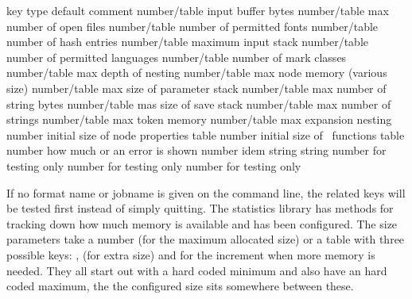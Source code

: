 \starttabulate[|l|l|l|l|]
\FL
\BC key                       \BC type         \BC default  \BC comment \NC \NR
\TL
\NC {}        \NC number/table  \NC input buffer bytes \NC \NR
\NC {}          \NC number/table  \NC max number of open files \NC \NR
\NC {}          \NC number/table  \NC number of permitted fonts \NC \NR
\NC {}          \NC number/table  \NC number of hash entries \NC \NR
\NC {}         \NC number/table  \NC maximum input stack \NC \NR
\NC {}      \NC number/table  \NC number of permitted languages \NC \NR
\NC {}          \NC number/table  \NC number of mark classes \NC \NR
\NC {}          \NC number/table  \NC max depth of nesting \NC \NR
\NC {}          \NC number/table  \NC max node memory (various size) \NC \NR
\NC {}     \NC number/table  \NC max size of parameter stack \NC \NR
\NC {}          \NC number/table  \NC max number of string bytes \NC \NR
\NC {}          \NC number/table  \NC mas size of save stack \NC \NR
\NC {}        \NC number/table  \NC max number of strings \NC \NR
\NC {}         \NC number/table  \NC max token memory \NC \NR
\ML
\NC {}        \NC number/table  \NC max expansion nesting \NC \NR
\NC {}    \NC number        \NC initial size of node properties table \NC \NR
\NC {}      \NC number        \NC initial size of \LUA\ functions table \NC \NR
\NC {}     \NC number        \NC how much or an error is shown \NC \NR
\NC {} \NC number        \NC idem \NC \NR
\ML
\NC {}        \NC string       \NC          \NC \NC \NR
\NC {}           \NC string       \NC          \NC \NC \NR
\ML
\NC {}         \NC number       \NC          \NC for testing only \NC \NR
\NC {}        \NC number       \NC          \NC for testing only \NC \NR
\NC {}     \NC number       \NC          \NC for testing only \NC \NR
\LL
\stoptabulate

If no format name or jobname is given on the command line, the related keys will
be tested first instead of simply quitting. The statistics library has methods
for tracking down how much memory is available and has been configured. The size
parameters take a number (for the maximum allocated size) or a table with three
possible keys: ,  (for extra size) and  for
the increment when more memory is needed. They all start out with a hard coded
minimum and also have an hard coded maximum, the the configured size sits
somewhere between these.


